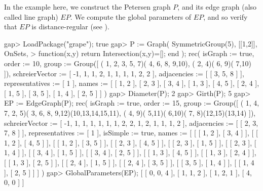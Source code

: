 In the example here, we construct the Petersen graph $P$, and its edge
graph (also called line graph) $EP$. We compute the global parameters
of $EP$, and so verify that $EP$ is distance-regular (see \cite{BCN89}).

\beginexample
gap> LoadPackage("grape");
true
gap> P := Graph( SymmetricGroup(5), [[1,2]], OnSets,
>             function(x,y) return Intersection(x,y)=[]; end );
rec( isGraph := true, order := 10, 
  group := Group([ ( 1, 2, 3, 5, 7)( 4, 6, 8, 9,10), ( 2, 4)( 6, 9)( 7,10) ]),
  schreierVector := [ -1, 1, 1, 2, 1, 1, 1, 1, 2, 2 ], 
  adjacencies := [ [ 3, 5, 8 ] ], representatives := [ 1 ], 
  names := [ [ 1, 2 ], [ 2, 3 ], [ 3, 4 ], [ 1, 3 ], [ 4, 5 ], [ 2, 4 ], 
      [ 1, 5 ], [ 3, 5 ], [ 1, 4 ], [ 2, 5 ] ] )
gap> Diameter(P);
2
gap> Girth(P);
5
gap> EP := EdgeGraph(P);
rec( isGraph := true, order := 15, 
  group := Group([ ( 1, 4, 7, 2, 5)( 3, 6, 8, 9,12)(10,13,14,15,11), 
      ( 4, 9)( 5,11)( 6,10)( 7, 8)(12,15)(13,14) ]), 
  schreierVector := [ -1, 1, 1, 1, 1, 1, 1, 2, 2, 1, 2, 1, 1, 1, 2 ], 
  adjacencies := [ [ 2, 3, 7, 8 ] ], representatives := [ 1 ], 
  isSimple := true, 
  names := [ [ [ 1, 2 ], [ 3, 4 ] ], [ [ 1, 2 ], [ 4, 5 ] ], 
      [ [ 1, 2 ], [ 3, 5 ] ], [ [ 2, 3 ], [ 4, 5 ] ], [ [ 2, 3 ], [ 1, 5 ] ], 
      [ [ 2, 3 ], [ 1, 4 ] ], [ [ 3, 4 ], [ 1, 5 ] ], [ [ 3, 4 ], [ 2, 5 ] ], 
      [ [ 1, 3 ], [ 4, 5 ] ], [ [ 1, 3 ], [ 2, 4 ] ], [ [ 1, 3 ], [ 2, 5 ] ], 
      [ [ 2, 4 ], [ 1, 5 ] ], [ [ 2, 4 ], [ 3, 5 ] ], [ [ 3, 5 ], [ 1, 4 ] ], 
      [ [ 1, 4 ], [ 2, 5 ] ] ] )
gap> GlobalParameters(EP);
[ [ 0, 0, 4 ], [ 1, 1, 2 ], [ 1, 2, 1 ], [ 4, 0, 0 ] ]
\endexample
